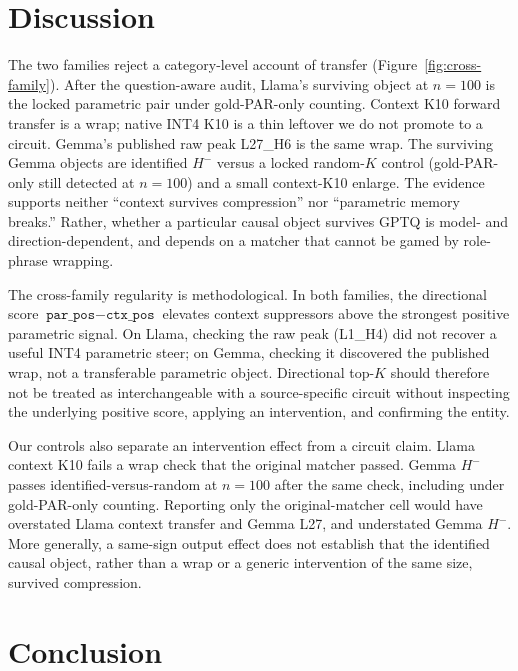 \documentclass{article} %
\begin{document}
\section{Discussion}
\label{sec:discussion}

The two families reject a category-level account of transfer (Figure~\ref{fig:cross-family}). After the question-aware audit, Llama's surviving object at $n{=}100$ is the locked parametric pair under gold-PAR-only counting. Context K10 forward transfer is a wrap; native INT4 K10 is a thin leftover we do not promote to a circuit. Gemma's published raw peak L27\_H6 is the same wrap. The surviving Gemma objects are identified $H^{-}$ versus a locked random-$K$ control (gold-PAR-only still detected at $n{=}100$) and a small context-K10 enlarge. The evidence supports neither ``context survives compression'' nor ``parametric memory breaks.'' Rather, whether a particular causal object survives GPTQ is model- and direction-dependent, and depends on a matcher that cannot be gamed by role-phrase wrapping.

The cross-family regularity is methodological. In both families, the directional score $\texttt{par\_pos}-\texttt{ctx\_pos}$ elevates context suppressors above the strongest positive parametric signal. On Llama, checking the raw peak (L1\_H4) did not recover a useful INT4 parametric steer; on Gemma, checking it discovered the published wrap, not a transferable parametric object. Directional top-$K$ should therefore not be treated as interchangeable with a source-specific circuit without inspecting the underlying positive score, applying an intervention, and confirming the entity.

Our controls also separate an intervention effect from a circuit claim. Llama context K10 fails a wrap check that the original matcher passed. Gemma $H^{-}$ passes identified-versus-random at $n{=}100$ after the same check, including under gold-PAR-only counting. Reporting only the original-matcher cell would have overstated Llama context transfer and Gemma L27, and understated Gemma $H^{-}$. More generally, a same-sign output effect does not establish that the identified causal object, rather than a wrap or a generic intervention of the same size, survived compression.


\section{Conclusion}
\label{sec:conclusion}
\end{document}
